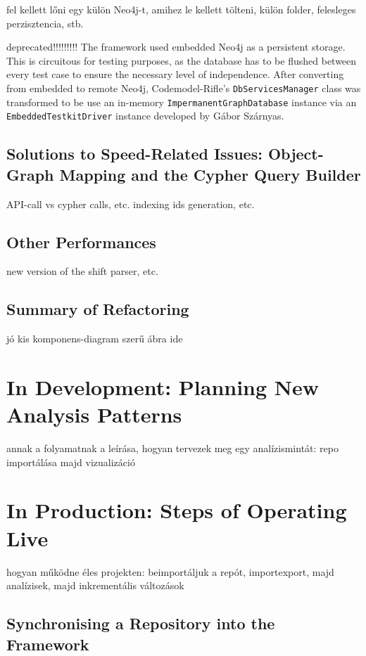 fel kellett lőni egy külön Neo4j-t, amihez le kellett tölteni, külön folder, felesleges perzisztencia, stb.

deprecated!!!!!!!!! The framework used embedded Neo4j as a persistent storage. This is circuitous for testing purposes, as the database has to be flushed between every test case to ensure the necessary level of independence. After converting from embedded to remote Neo4j, Codemodel-Rifle's \texttt{DbServicesManager} class was transformed to be use an in-memory \texttt{ImpermanentGraphDatabase} instance via an \texttt{EmbeddedTestkitDriver} instance developed by Gábor Szárnyas.~\cite{neo4j-drivers}


\subsection{Solutions to Speed-Related Issues: Object-Graph Mapping and the Cypher Query Builder}

API-call vs cypher calls, etc.
indexing
ids generation, etc.


\subsection{Other Performances}

new version of the shift parser, etc.


\subsection{Summary of Refactoring}

jó kis komponens-diagram szerű ábra ide


\section{In Development: Planning New Analysis Patterns}

annak a folyamatnak a leírása, hogyan tervezek meg egy analízismintát: repo importálása majd vizualizáció


\section{In Production: Steps of Operating Live}

hogyan működne éles projekten: beimportáljuk a repót, importexport, majd analízisek, majd inkrementális változások


\subsection{Synchronising a Repository into the Framework}


